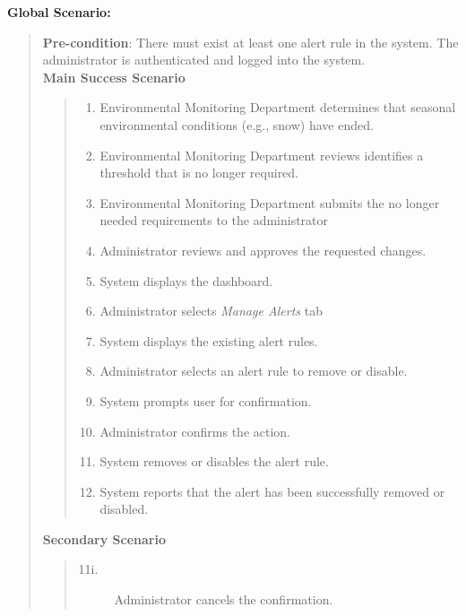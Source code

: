 \documentclass[]{article}
\begin{document}
\begin{enumerate}[{\bf BE3.}]
        {\bf Global Scenario:}
        	\begin{quote}
        	    \textbf{Pre-condition}: There must exist at least one alert rule in the system. The administrator is authenticated and logged into the system. \\
                \textbf{Main Success Scenario} 
                    \begin{quote}
                    \begin{enumerate}[1.]
                        \item Environmental Monitoring Department determines that seasonal environmental conditions (e.g., snow) have ended.
                        \item Environmental Monitoring Department reviews identifies a threshold that is no longer required.
                        \item Environmental Monitoring Department submits the no longer needed requirements to the administrator
                        \item Administrator reviews and approves the requested changes.
                        \item System displays the dashboard.
                        \item Administrator selects \textit{Manage Alerts} tab
                        \item System displays the existing alert rules.
                        \item Administrator selects an alert rule to remove or disable.
                        \item System prompts user for confirmation.
                        \item Administrator confirms the action.
                        \item System removes or disables the alert rule.
                        \item System reports that the alert has been successfully removed or disabled.
                    \end{enumerate}
                    \end{quote}
                \textbf{Secondary Scenario} 
                \begin{quote}
                    \begin{description}
                        \item[\textmd{11i.}] Administrator cancels the confirmation.
                        \begin{description}

\end{description}
\end{description}
\end{quote}
\end{quote}
\end{enumerate}
\end{document}
